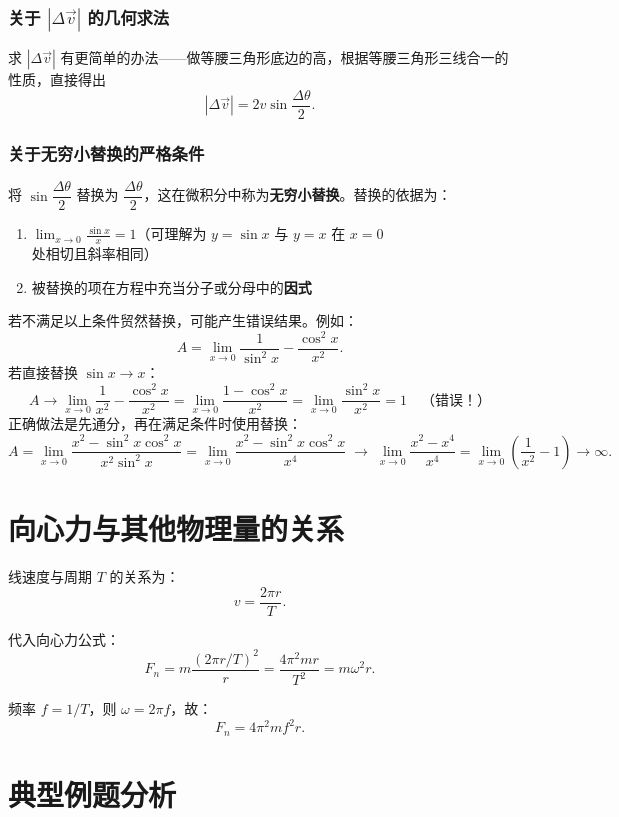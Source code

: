 \documentclass[12pt,a4paper]{article}
\begin{document}
\subsubsection{关于 $|\Delta\vec{v}|$ 的几何求法}

求 $|\Delta\vec{v}|$ 有更简单的办法——做等腰三角形底边的高，根据等腰三角形三线合一的性质，直接得出
\[
|\Delta\vec{v}| = 2v\sin\frac{\Delta\theta}{2}.
\]

\subsubsection{关于无穷小替换的严格条件}

将 $\sin\dfrac{\Delta\theta}{2}$ 替换为 $\dfrac{\Delta\theta}{2}$，这在微积分中称为\textbf{无穷小替换}。替换的依据为：

\begin{enumerate}
\item $\displaystyle\lim_{x\to 0}\frac{\sin x}{x}=1$（可理解为 $y=\sin x$ 与 $y=x$ 在 $x=0$ 处相切且斜率相同）
\item 被替换的项在方程中充当分子或分母中的\textbf{因式}
\end{enumerate}

若不满足以上条件贸然替换，可能产生错误结果。例如：
\[
A = \lim_{x\to 0}\frac{1}{\sin^2 x} - \frac{\cos^2 x}{x^2}.
\]
若直接替换 $\sin x\to x$：
\[
A \to \lim_{x\to 0}\frac{1}{x^2} - \frac{\cos^2 x}{x^2}
= \lim_{x\to 0}\frac{1-\cos^2 x}{x^2}
= \lim_{x\to 0}\frac{\sin^2 x}{x^2} = 1 \quad\text{（错误！）}
\]
正确做法是先通分，再在满足条件时使用替换：
\[
A = \lim_{x\to 0}\frac{x^2 - \sin^2 x\cos^2 x}{x^2\sin^2 x}
= \lim_{x\to 0}\frac{x^2 - \sin^2 x\cos^2 x}{x^4}
\;\longrightarrow\;
\lim_{x\to 0}\frac{x^2 - x^4}{x^4} = \lim_{x\to 0}\left(\frac{1}{x^2}-1\right) \to \infty.
\]

\section{向心力与其他物理量的关系}

线速度与周期 $T$ 的关系为：
\[
v = \frac{2\pi r}{T}.
\]

代入向心力公式：
\[
F_n = m\frac{(2\pi r/T)^2}{r} = \frac{4\pi^2mr}{T^2} = m\omega^2 r.
\]

频率 $f=1/T$，则 $\omega = 2\pi f$，故：
\[
F_n = 4\pi^2 mf^2 r.
\]

\section{典型例题分析}
\end{document}
